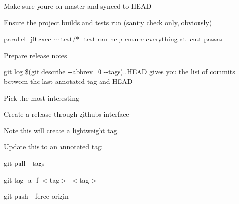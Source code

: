 
\begin{DoxyItemize}
\item Make sure you\textquotesingle{}re on master and synced to HEAD
\item Ensure the project builds and tests run (sanity check only, obviously)
\begin{DoxyItemize}
\item {\ttfamily parallel -\/j0 exec \+::\+: test/$\ast$\+\_\+test} can help ensure everything at least passes
\end{DoxyItemize}
\item Prepare release notes
\begin{DoxyItemize}
\item {\ttfamily git log \$(git describe -\/-\/abbrev=0 -\/-\/tags)..HEAD} gives you the list of commits between the last annotated tag and HEAD
\item Pick the most interesting.
\end{DoxyItemize}
\item Create a release through github\textquotesingle{}s interface
\begin{DoxyItemize}
\item Note this will create a lightweight tag.
\item Update this to an annotated tag\+:
\begin{DoxyItemize}
\item {\ttfamily git pull -\/-\/tags}
\item {\ttfamily git tag -\/a -\/f \texorpdfstring{$<$}{<}tag\texorpdfstring{$>$}{>} \texorpdfstring{$<$}{<}tag\texorpdfstring{$>$}{>}}
\item {\ttfamily git push -\/-\/force origin} 
\end{DoxyItemize}
\end{DoxyItemize}
\end{DoxyItemize}